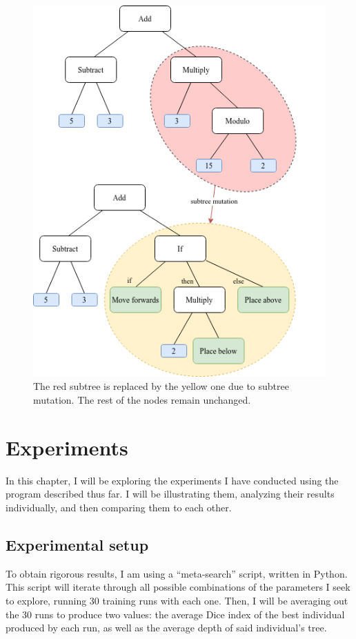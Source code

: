 \documentclass{report}
\begin{document}
\begin{figure}[H]
    \centering
    \includegraphics[scale=0.75]{subtree_mutation}
    \caption{The red subtree is replaced by the yellow one due to subtree mutation. The rest of the nodes remain unchanged.}
\end{figure}

\chapter{Experiments}

In this chapter, I will be exploring the experiments I have conducted using the program described thus far. I will be illustrating them, analyzing their results individually, and then comparing them to each other.

\section{Experimental setup}

To obtain rigorous results, I am using a ``meta-search'' script, written in Python. This script will iterate through all possible combinations of the parameters I seek to explore, running 30 training runs with each one. Then, I will be averaging out the 30 runs to produce two values: the average Dice index of the best individual produced by each run, as well as the average depth of said individual's tree.
\end{document}
